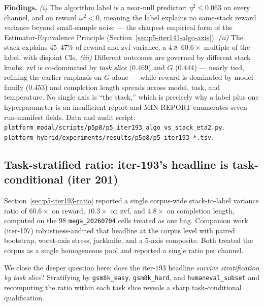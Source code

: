 \documentclass{article}  \usepackage[preprint,nonatbib]{neurips_2026} \usepackage[numbers]{natbib}
\begin{document}
\textbf{Findings.} \textit{(i)} The algorithm label is a near-null predictor:
$\eta^2 \le 0.063$ on every channel, and on reward $\omega^2 < 0$, meaning the
label explains no same-stack reward variance beyond small-sample noise --- the
sharpest empirical form of the Estimator-Equivalence Principle
(Section~\ref{sec:p5-iter141-algo-axis}). \textit{(ii)} The stack explains
$45$--$47\%$ of reward and zvf variance, a $4.8$--$60.6\times$ multiple of the
label, with disjoint CIs. \textit{(iii)} Different outcomes are governed by
different stack knobs: zvf is co-dominated by \emph{task slice}
($0.469$) and $G$ ($0.444$) --- nearly tied, refining the earlier emphasis on
$G$ alone --- while reward is dominated by model family ($0.453$) and
completion length spreads across model, task, and temperature. No single axis is
``the stack,'' which is precisely why a label plus one hyperparameter is an
insufficient report and MIN-REPORT enumerates seven run-manifest fields. Data and audit
script: \texttt{platform_modal/scripts/p5p8/p5\_iter193\_algo\_vs\_stack\_eta2.py},
\texttt{platform_hybrid/experiments/results/p5p8/p5\_iter193\_*.tsv}.
 \subsection{Task-stratified ratio: iter-193's headline is task-conditional (iter 201)}
\label{sec:p5-iter201-task-stratified}

Section~\ref{sec:p5-iter193-ratio} reported a single corpus-wide
stack-to-label variance ratio of $60.6\times$ on reward,
$10.3\times$ on zvf, and $4.8\times$ on completion length, computed
on the $98$ \texttt{mega\_20260704} cells treated as one bag.
Companion work (iter-197) robustness-audited that headline at the
corpus level with paired bootstrap, worst-axis stress, jackknife,
and a $5$-axis composite. Both treated the corpus as a single
homogeneous pool and reported a single ratio per channel.

We close the deeper question here: does the iter-193 headline
\emph{survive stratification by task slice}? Stratifying by
\texttt{gsm8k\_easy}, \texttt{gsm8k\_hard}, and
\texttt{humaneval\_subset} and recomputing the ratio within each
task slice reveals a sharp task-conditional qualification.
\end{document}
